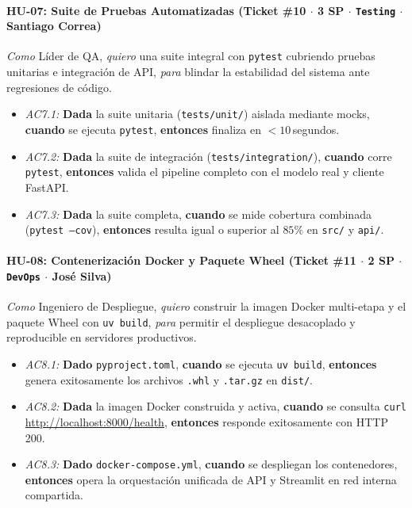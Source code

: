 \documentclass[12pt,letterpaper]{article}
\begin{document}
\paragraph{HU-07: Suite de Pruebas Automatizadas (Ticket \#10 $\cdot$ 3 SP $\cdot$ \texttt{Testing} $\cdot$ Santiago Correa)}
\textit{Como} Líder de QA, \textit{quiero} una suite integral con \texttt{pytest} cubriendo pruebas unitarias e integración de API, \textit{para} blindar la estabilidad del sistema ante regresiones de código.
\begin{itemize}[leftmargin=*,noitemsep]
    \item \textit{AC7.1:} \textbf{Dada} la suite unitaria (\texttt{tests/unit/}) aislada mediante mocks, \textbf{cuando} se ejecuta \texttt{pytest}, \textbf{entonces} finaliza en $< 10$\,segundos.
    \item \textit{AC7.2:} \textbf{Dada} la suite de integración (\texttt{tests/integration/}), \textbf{cuando} corre \texttt{pytest}, \textbf{entonces} valida el pipeline completo con el modelo real y cliente FastAPI.
    \item \textit{AC7.3:} \textbf{Dada} la suite completa, \textbf{cuando} se mide cobertura combinada (\texttt{pytest --cov}), \textbf{entonces} resulta igual o superior al $85\%$ en \texttt{src/} y \texttt{api/}.
\end{itemize}

\paragraph{HU-08: Contenerización Docker y Paquete Wheel (Ticket \#11 $\cdot$ 2 SP $\cdot$ \texttt{DevOps} $\cdot$ José Silva)}
\textit{Como} Ingeniero de Despliegue, \textit{quiero} construir la imagen Docker multi-etapa y el paquete Wheel con \texttt{uv build}, \textit{para} permitir el despliegue desacoplado y reproducible en servidores productivos.
\begin{itemize}[leftmargin=*,noitemsep]
    \item \textit{AC8.1:} \textbf{Dado} \texttt{pyproject.toml}, \textbf{cuando} se ejecuta \texttt{uv build}, \textbf{entonces} genera exitosamente los archivos \texttt{.whl} y \texttt{.tar.gz} en \texttt{dist/}.
    \item \textit{AC8.2:} \textbf{Dada} la imagen Docker construida y activa, \textbf{cuando} se consulta \texttt{curl} \url{http://localhost:8000/health}, \textbf{entonces} responde exitosamente con HTTP 200.
    \item \textit{AC8.3:} \textbf{Dado} \texttt{docker-compose.yml}, \textbf{cuando} se despliegan los contenedores, \textbf{entonces} opera la orquestación unificada de API y Streamlit en red interna compartida.
\end{itemize}
\end{document}
